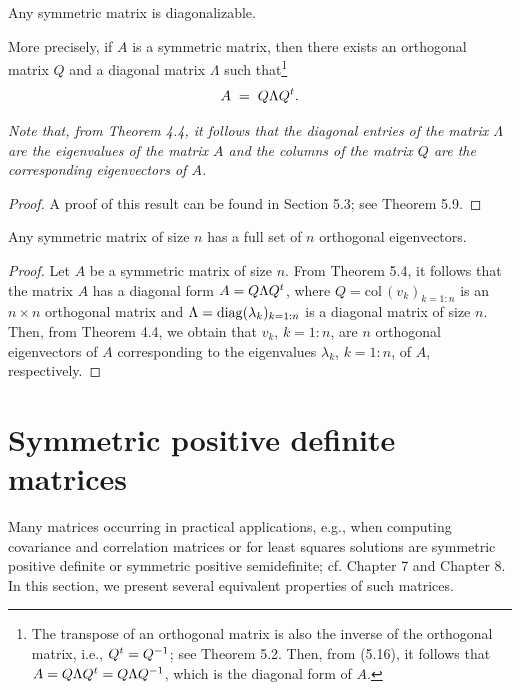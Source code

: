\begin{theorem}
Any symmetric matrix is diagonalizable.

More precisely, if $A$ is a symmetric matrix, then there exists an orthogonal matrix
$Q$ and a diagonal matrix $\Lambda$ such that\footnote{The transpose of an orthogonal
matrix is also the inverse of the orthogonal matrix, i.e., $Q^{t} = Q^{-1}$; see
Theorem 5.2. Then, from (5.16), it follows that $A = Q\Lambda Q^{t} = Q\Lambda Q^{-1}$,
which is the diagonal form of $A$.}
\begin{equation}
A \;=\; Q\Lambda Q^{t}.
\end{equation}
\end{theorem}

\textit{Note that, from Theorem 4.4, it follows that the diagonal entries of the
matrix $\Lambda$ are the eigenvalues of the matrix $A$ and the columns of the matrix
$Q$ are the corresponding eigenvectors of $A$.}

\begin{proof}
A proof of this result can be found in Section 5.3; see Theorem 5.9.
\end{proof}

\begin{theorem}
Any symmetric matrix of size $n$ has a full set of $n$ orthogonal eigenvectors.
\end{theorem}

\begin{proof}
Let $A$ be a symmetric matrix of size $n$. From Theorem 5.4, it follows that the
matrix $A$ has a diagonal form $A = Q\Lambda Q^{t}$, where $Q = \mathrm{col}\,(v_k)_{k=1:n}$
is an $n \times n$ orthogonal matrix and $\Lambda = \operatorname{diag}(\lambda_k)_{k=1:n}$ is a
diagonal matrix of size $n$. Then, from Theorem 4.4, we obtain that $v_k$, $k = 1:n$,
are $n$ orthogonal eigenvectors of $A$ corresponding to the eigenvalues $\lambda_k$,
$k = 1:n$, of $A$, respectively.
\end{proof}

\section{Symmetric positive definite matrices}

Many matrices occurring in practical applications, e.g., when computing covariance and
correlation matrices or for least squares solutions are symmetric positive definite or
symmetric positive semidefinite; cf. Chapter 7 and Chapter 8. In this section, we
present several equivalent properties of such matrices.

